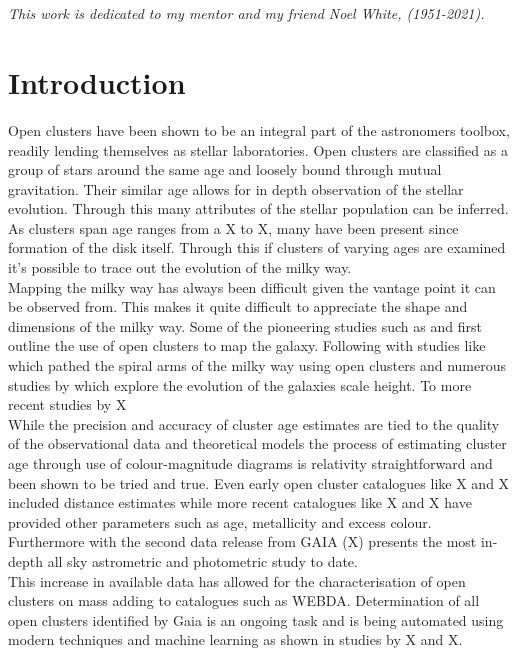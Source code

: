 \section*{}


\begin{center}
    \textit{This work is dedicated to my mentor and my friend Noel White, (1951-2021).}
\end{center}

\section{Introduction} \label{sec:intro}

Open clusters have been shown to be an integral part of the astronomers toolbox, readily lending themselves as stellar laboratories. Open clusters are classified as a group of stars around the same age and loosely bound through mutual gravitation. 
Their similar age allows for in depth observation of the stellar evolution.  Through this many attributes of the stellar population can be inferred. As clusters span age ranges from a X to X, many have been present since formation of the disk itself. Through this if clusters of varying ages are examined it's possible to trace out the evolution of the milky way.  \\

Mapping the milky way has always been difficult given the vantage point it can be observed from. This makes it quite difficult to appreciate the shape and dimensions of the milky way. Some of the pioneering studies such as \cite{1785RSPT...75..213H,1918ApJ....48..154S} and \cite{1930LicOB..14..154T} first outline the use of open clusters to map the galaxy. Following with studies like \cite{1970IAUS...38..205B} which pathed the spiral arms of the milky way using open clusters and numerous studies by \cite{1958ZA.....46..176V} which explore the evolution of the galaxies scale height. To more recent studies by X \\

While the precision and accuracy of cluster age estimates are tied to the quality of the observational data and theoretical models the process of estimating cluster age through use of colour-magnitude diagrams is relativity straightforward  and been shown to be tried and true. Even early open cluster catalogues like X and X included distance estimates while more recent catalogues like X and X have provided other parameters such as age, metallicity  and excess colour. Furthermore with the second data release from GAIA (X) presents the most in-depth all sky astrometric and photometric study to date. \\
This increase in available data has allowed for the characterisation of open clusters on mass adding to catalogues such as WEBDA. Determination of all open clusters identified by Gaia is an ongoing task and is being automated using modern techniques and machine learning as shown in studies by X and X. \\

